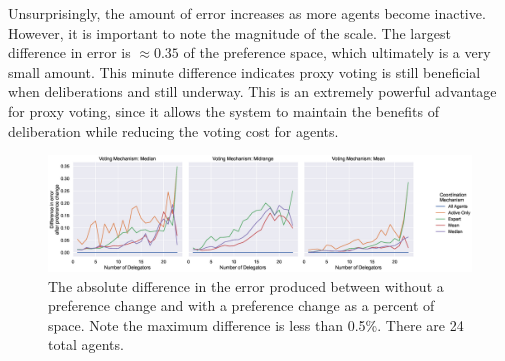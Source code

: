 Unsurprisingly, the amount of error increases as more agents become inactive.
However, it is important to note the magnitude of the scale.
The largest difference in error is $\approx 0.35$ of the preference space,
which ultimately is a very small amount.
This minute difference indicates proxy voting is still beneficial when deliberations
and still underway.
This is an extremely powerful advantage for proxy voting, since it allows the system
to maintain the benefits of deliberation while reducing the voting cost for agents.
\begin{landscape}
    \begin{figure}[p]
        \centering
        \includegraphics[scale=0.55]
        {content/chapter2/figures/abs_diff_from_preference_change_error_as_percent_of_space_abs_mean}
        \caption{
            The absolute difference in the error produced between without a
            preference change and with a preference change as a percent of space.
            Note the maximum difference is less than 0.5\%.
            There are 24 total agents.
        }
        \label{fig:abs-diff-from-preference-change-error-as-percent-of-space-abs-mean}
    \end{figure}
\end{landscape}

